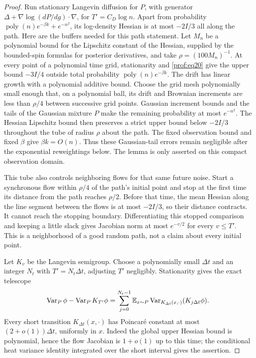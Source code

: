 \begin{proof}
Run stationary Langevin diffusion for \(P\), with generator
\(\Delta+\nabla\log(dP/dg)\cdot\nabla\), for
\(T'=C_D\log n\).  Apart from probability
\(\operatorname{poly}(n)e^{-\beta k}+e^{-n^2}\), its log-density Hessian
is at most \(-2I/3\) all along the path. Here are the buffers needed
for this path statement. Let \(M_n\) be a polynomial bound for the
Lipschitz constant of the Hessian, supplied by the bounded-spin
formulas for posterior derivatives, and take
\(\rho=(100M_n)^{-1}\). At every point of a polynomial time grid,
stationarity and \eqref{prof:eq20} give the upper bound \(-3I/4\)
outside total probability \(\operatorname{poly}(n)e^{-\beta k}\).
The drift has linear growth with a polynomial additive bound.
Choose the grid mesh polynomially small enough that, on a
polynomial ball, its drift and Brownian increments are less than
\(\rho/4\) between successive grid points. Gaussian increment
bounds and the tails of the Gaussian mixture \(P\) make the
remaining probability at most \(e^{-n^2}\). The Hessian Lipschitz
bound then preserves a strict upper bound below \(-2I/3\)
throughout the tube of radius \(\rho\) about the path.
The fixed observation bound and fixed \(\beta\) give
\(\beta k=O(n)\). Thus these Gaussian-tail errors remain negligible
after the exponential reweightings below. The lemma is only asserted
on this compact observation domain.

This tube also controls neighboring flows for that same future
noise. Start a synchronous flow within \(\rho/4\) of the path's
initial point and stop at the first time its distance from the
path reaches \(\rho/2\). Before that time, the mean Hessian along
the line segment between the flows is at most \(-2I/3\), so their
distance contracts. It cannot reach the stopping boundary.
Differentiating this stopped comparison and keeping a little slack
gives Jacobian norm at most \(e^{-v/2}\) for every \(v\le T'\).
This is a neighborhood of a good random path, not a claim about
every initial point.

Let \(K_v\) be the Langevin semigroup. Choose a polynomially small
\(\Delta t\) and an integer \(N_t\) with \(T'=N_t\Delta t\),
adjusting \(T'\) negligibly. Stationarity gives the exact telescope
\[
 \operatorname{Var}_P\phi-\operatorname{Var}_P K_{T'}\phi
 =\sum_{j=0}^{N_t-1}\mathbb E_{x\sim P}
   \operatorname{Var}_{K_{\Delta t}(x,\cdot)}
                  (K_{j\Delta t}\phi).
\]
Every short transition \(K_{\Delta t}(x,\cdot)\) has Poincar\'e constant
at most \((2+o(1))\Delta t\), uniformly in \(x\).  Indeed the global
upper Hessian bound is polynomial, hence the flow Jacobian is
\(1+o(1)\) up to this time; the conditional heat variance identity
integrated over the short interval gives the assertion.


\end{proof}
